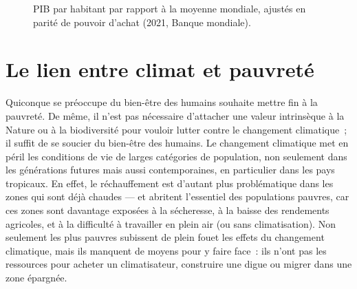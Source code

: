 \documentclass[a5paper,french]{memoir}
\begin{document}
\begin{figure}[h!]
  \caption{PIB par habitant par rapport à la moyenne mondiale, ajustés en parité de pouvoir d'achat (2021, Banque mondiale). %
  }\label{fig:GDPpc}
\end{figure}

\section{Le lien entre climat et pauvreté} 

Quiconque se préoccupe du bien-être des humains souhaite mettre fin à la pauvreté. 
De même, il n'est pas nécessaire d'attacher une valeur intrinsèque à la Nature ou à la biodiversité pour vouloir lutter contre le changement climatique~; il suffit de se soucier du bien-être des humains. Le changement climatique met en péril les conditions de vie de larges catégories de population, non seulement dans les générations futures mais aussi contemporaines, en particulier dans les pays tropicaux. En effet, le réchauffement est d'autant plus problématique dans les zones qui sont déjà chaudes --- et abritent l'essentiel des populations pauvres, car ces zones sont davantage exposées à la sécheresse, à la baisse des rendements agricoles, et à la difficulté à travailler en plein air (ou sans climatisation). Non seulement les plus pauvres subissent de plein fouet les effets du changement climatique, mais ils manquent de moyens pour y faire face~: %
ils n'ont pas les ressources pour acheter un climatisateur, construire une digue ou migrer dans une zone épargnée. 

\end{document}
